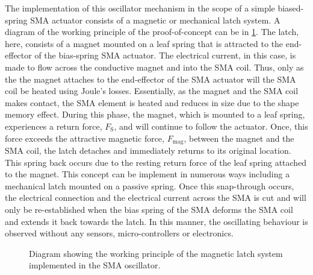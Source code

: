 The implementation of this oscillator mechanism in the scope of a simple biased-spring SMA actuator consists of a magnetic or mechanical latch system. A diagram of the working principle of the proof-of-concept can be in \cref{fig:oscillator-schematic}. The latch, here, consists of a magnet mounted on a leaf spring that is attracted to the end-effector of the bias-spring SMA actuator. The electrical current, in this case, is made to flow across the conductive magnet and into the SMA coil. Thus, only as the the magnet attaches to the end-effector of the SMA actuator will the SMA coil be heated using Joule's losses. Essentially, as the magnet and the SMA coil makes contact, the SMA element is heated and reduces in size due to the shape memory effect. During this phase, the magnet, which is mounted to a leaf spring, experiences a return force, $F_\textrm{S}$, and will continue to follow the actuator. Once, this force exceeds the attractive magnetic force, $F_\textrm{mag}$, between the magnet and the SMA coil, the latch detaches and immediately returns to its original location. This spring back occurs due to the resting return force of the leaf spring attached to the magnet. This concept can be implement in numerous ways including a mechanical latch mounted on a passive spring. Once this snap-through occurs, the electrical connection and the electrical current across the SMA is cut and will only be re-established when the bias spring of the SMA deforms the SMA coil and extends it back towards the latch. In this manner, the oscillating behaviour is observed without any sensors, micro-controllers or electronics.


\begin{figure}[ht] %
  \centering
  \resizebox{0.6\textwidth}{!}{}
  \caption{Diagram showing the working principle of the magnetic latch system implemented in the SMA oscillator.}
  \label{fig:oscillator-schematic}
\end{figure}


